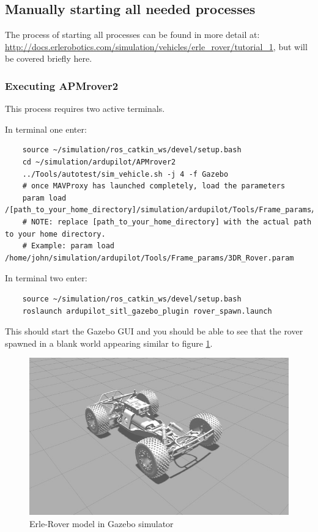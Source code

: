 \documentclass{report}
\begin{document}
\subsection{Manually starting all needed processes}
The process of starting all processes can be found in more detail at: \\ \href{http://docs.erlerobotics.com/simulation/vehicles/erle_rover/tutorial_1}{http://docs.erlerobotics.com/simulation/vehicles/erle\_rover/tutorial\_1}, but will be covered briefly here.
\subsubsection{Executing APMrover2}\label{MAVmanual}
This process requires two active terminals. 

In terminal one enter:
\begin{lstlisting}
	source ~/simulation/ros_catkin_ws/devel/setup.bash
	cd ~/simulation/ardupilot/APMrover2
	../Tools/autotest/sim_vehicle.sh -j 4 -f Gazebo
	# once MAVProxy has launched completely, load the parameters
	param load /[path_to_your_home_directory]/simulation/ardupilot/Tools/Frame_params/3DR_Rover.param
	# NOTE: replace [path_to_your_home_directory] with the actual path to your home directory.
	# Example: param load /home/john/simulation/ardupilot/Tools/Frame_params/3DR_Rover.param
\end{lstlisting}

In terminal two enter:
\begin{lstlisting}
	source ~/simulation/ros_catkin_ws/devel/setup.bash
	roslaunch ardupilot_sitl_gazebo_plugin rover_spawn.launch
\end{lstlisting}

This should start the Gazebo GUI and you should be able to see that the rover spawned in a blank world appearing similar to figure \ref{Erle-Rover-model}.

\begin{figure}[ht]
	\centering
	\includegraphics[scale = 0.35]{Images/rover}
	\caption{Erle-Rover model in Gazebo simulator}
	\label{Erle-Rover-model}
\end{figure}
\end{document}
